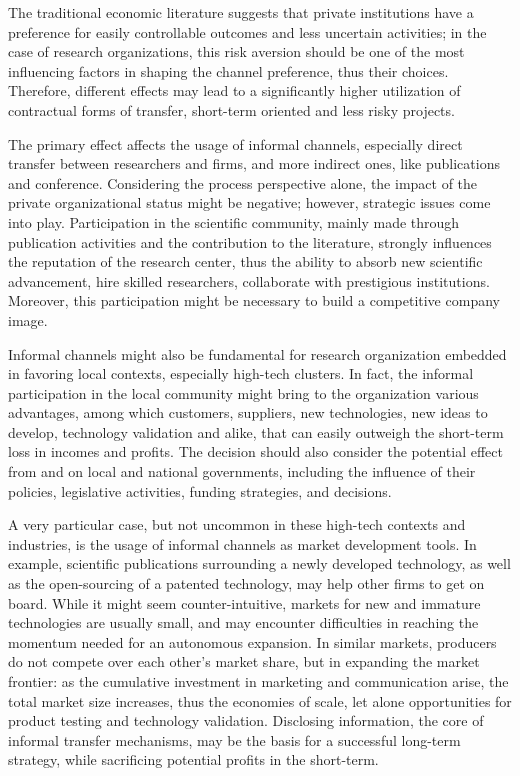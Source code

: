 The traditional economic literature suggests that private institutions have a preference for easily controllable outcomes and less uncertain activities; in the case of research organizations, this risk aversion should be one of the most influencing factors in shaping the channel preference, thus their choices. Therefore, different effects may lead to a significantly higher utilization of contractual forms of transfer, short-term oriented and less risky projects.

The primary effect affects the usage of informal channels, especially direct transfer between researchers and firms, and more indirect ones, like publications and conference. Considering the process perspective alone, the impact of the private organizational status might be negative; however, strategic issues come into play. Participation in the scientific community, mainly made through publication activities and the contribution to the literature, strongly influences the reputation of the research center, thus the ability to absorb new scientific advancement, hire skilled researchers, collaborate with prestigious institutions. Moreover, this participation might be necessary to build a competitive company image.

Informal channels might also be fundamental for research organization embedded in favoring local contexts, especially high-tech clusters. In fact, the informal participation in the local community might bring to the organization various advantages, among which customers, suppliers, new technologies, new ideas to develop, technology validation and alike, that can easily outweigh the short-term loss in incomes and profits. The decision should also consider the potential effect from and on local and national governments, including the influence of their policies, legislative activities, funding strategies, and decisions. 

A very particular case, but not uncommon in these high-tech contexts and industries, is the usage of informal channels as market development tools. In example, scientific publications surrounding a newly developed technology, as well as the open-sourcing of a patented technology, may help other firms to get on board. While it might seem counter-intuitive, markets for new and immature technologies are usually small, and may encounter difficulties in reaching the momentum needed for an autonomous expansion. In similar markets, producers do not compete over each other's market share, but in expanding the market frontier: as the cumulative investment in marketing and communication arise, the total market size increases, thus the economies of scale, let alone opportunities for product testing and technology validation. Disclosing information, the core of informal transfer mechanisms, may be the basis for a successful long-term strategy, while sacrificing potential profits in the short-term.

